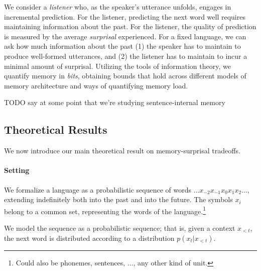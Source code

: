 \documentclass[11pt,letterpaper]{article}
\begin{document}
We consider a \emph{listener} who, as the speaker's utterance unfolds, engages in incremental prediction.
For the listener, predicting the next word well requires maintaining information about the past.
For the listener, the quality of prediction is measured by the average \emph{surprisal} experienced.
For a fixed language, we can ask how much information about the past (1) the speaker has to maintain to produce well-formed utterances, and (2) the listener has to maintain to incur a minimal amount of surprisal.
Utilizing the tools of information theory, we quantify memory in \emph{bits}, obtaining bounds that hold across different models of memory architecture and ways of quantifying memory load.


TODO say at some point that we're studying sentence-internal memory

\subsection{Theoretical Results}


We now introduce our main theoretical result on memory-surprisal tradeoffs.

\paragraph{Setting}
We formalize a language as a probabilistic sequence of words $\dots x_{-2} x_{-1} x_0 x_{1} x_{2} \dots$, extending indefinitely both into the past and into the future.
The symbols $x_i$ belong to a common set, representing the words of the language.\footnote{Could also be phonemes, sentences, ..., any other kind of unit.}

We model the sequence as a probabilistic sequence; that is, given a context $x_{<t}$, the next word is distributed according to a distribution $p(x_t|x_{<t})$.
\end{document}
